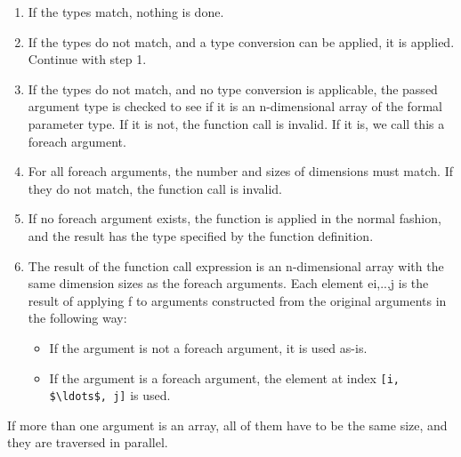\begin{enumerate}
\item
  If the types match, nothing is done.
\item
  If the types do not match, and a type conversion can be applied, it is
  applied. Continue with step 1.
\item
  If the types do not match, and no type conversion is applicable, the
  passed argument type is checked to see if it is an n-dimensional array
  of the formal parameter type. If it is not, the function call is
  invalid. If it is, we call this a foreach argument.
\item
  For all foreach arguments, the number and sizes of dimensions must
  match. If they do not match, the function call is invalid.
\item
  If no foreach argument exists, the function is applied in the normal
  fashion, and the result has the type specified by the function
  definition.
\item
  The result of the function call expression is an n-dimensional array
  with the same dimension sizes as the foreach arguments. Each element
  ei,..,j is the result of applying f to arguments constructed from the
  original arguments in the following way:
\begin{itemize}
\item
  If the argument is not a foreach argument, it is used as-is.
\item
  If the argument is a foreach argument, the element at index
  \lstinline![i, $\ldots$, j]! is used.
\end{itemize}
\end{enumerate}

If more than one argument is an array, all of them have to be the same
size, and they are traversed in parallel.


